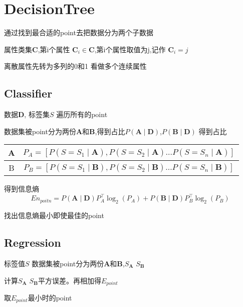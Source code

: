 \documentclass{ctexart}
\newcommand{\bb}[1]{\mathbf{#1}} %
\newcommand{\bmA}{\bb{A}}
\newcommand{\bmB}{\bb{B}}
\newcommand{\bmC}{\bb{C}}
\newcommand{\bmD}{\bb{D}}
\begin{document}
\section{DecisionTree}
通过找到最合适的point去把数据分为两个子数据

属性类集$ \bmC $,第i个属性 $ \bmC_i \in \bmC $,第i个属性取值为j,记作 $\bmC_i = j$

离散属性先转为多列的0和1 看做多个连续属性

\subsection{Classifier}

数据$\bmD$, 标签集$S$
遍历所有的point

数据集被point分为两份$\bmA$和$\bmB$,得到占比$P(\bmA \mid \bmD)$,$P(\bmB \mid \bmD)$
得到占比
\begin{center}
    \begin{tabular}{|c|c|}
        \hline
        A & $P_A = [P(S = S_1 \mid \bmA),P(S = S_2 \mid \bmA) \dots P(S = S_n \mid \bmA)]$ \\ \hline
        B & $P_B = [P(S = S_1 \mid \bmB),P(S = S_2 \mid \bmB) \dots P(S = S_n \mid \bmB)]$ \\ \hline
    \end{tabular}
\end{center}

得到信息熵
$$
En_{poitn} = P(\bmA \mid \bmD) P_A^\top \log_2(P_A) + P(\bmB \mid \bmD) P_B^\top \log_2(P_B)
$$

找出信息熵最小即使最佳的point

\subsection{Regression}
标签值$S$
数据集被point分为两份$\bmA$和$\bmB$,$S_\bmA$ $S_\bmB$

计算$S_\bmA$ $S_\bmB$平方误差。再相加得$E_{point}$

取$E_{point}$最小时的point
\end{document}
